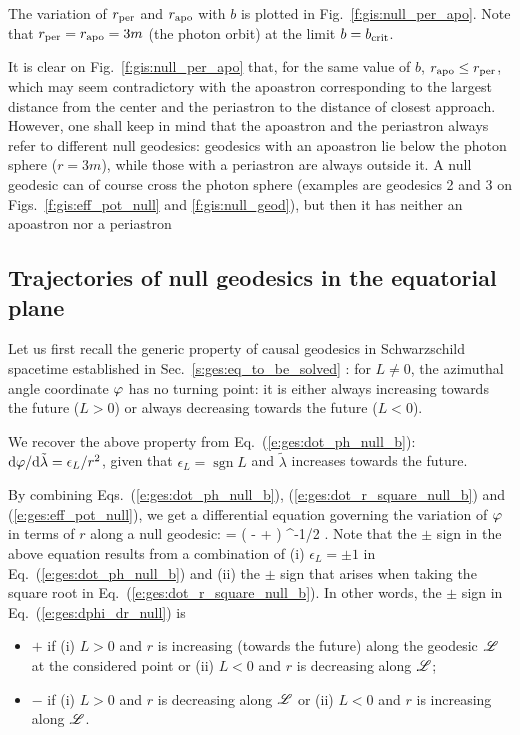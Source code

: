 The variation of $r_{\rm per}$ and $r_{\rm apo}$ with $b$ is plotted
in Fig.~\ref{f:gis:null_per_apo}. Note that $r_{\rm per} = r_{\rm apo} = 3 m$
(the photon orbit) at the limit $b = b_{\rm crit}$.
\begin{remark}
It is clear on Fig.~\ref{f:gis:null_per_apo} that, for the same value of $b$,
$r_{\rm apo} \leq r_{\rm per}$, which may seem contradictory with the apoastron
corresponding to the largest distance from the center and the periastron to
the distance of closest approach.
However, one shall keep in mind that the apoastron and the periastron always refer to different null
geodesics: geodesics with an apoastron lie below the photon sphere ($r=3m$), while those
with a periastron are always outside it. A null geodesic can of course cross
the photon sphere (examples are geodesics 2 and 3 on Figs.~\ref{f:gis:eff_pot_null}
and \ref{f:gis:null_geod}), but then it has neither an apoastron nor a periastron
\end{remark}


\subsection{Trajectories of null geodesics in the equatorial plane}

Let us first recall the generic property of causal geodesics in Schwarzschild
spacetime established in Sec.~\ref{s:ges:eq_to_be_solved} : for $L\not=0$,
the azimuthal angle coordinate $\varphi$ has no turning point: it is either always increasing
towards the future
($L>0$) or always decreasing towards the future ($L<0$).
\begin{remark}
We recover the above property from Eq.~(\ref{e:ges:dot_ph_null_b}):
$\mathrm{d}\varphi/\mathrm{d}\tilde{\lambda} = \epsilon_L/r^2$, given that
$\epsilon_L = \operatorname{sgn} L$ and $\tilde{\lambda}$ increases towards
the future.
\end{remark}
By combining Eqs.~(\ref{e:ges:dot_ph_null_b}), (\ref{e:ges:dot_r_square_null_b})
and (\ref{e:ges:eff_pot_null}), we get a differential equation governing
the variation of $\varphi$ in terms of $r$ along a null geodesic:
\be \label{e:ges:dphi_dr_null}
     = \pm {} \left( 
        -  +    \right) ^{-1/2} .
\ee
Note that the $\pm$ sign in the above equation results from a combination of
(i) $\epsilon_L=\pm 1$ in Eq.~(\ref{e:ges:dot_ph_null_b}) and
(ii) the $\pm$ sign that arises when taking the square
root in Eq.~(\ref{e:ges:dot_r_square_null_b}). In other words, the $\pm$ sign
in Eq.~(\ref{e:ges:dphi_dr_null}) is
\begin{itemize}
\item $+$ if (i) $L>0$ and $r$ is increasing (towards the future) along the geodesic
$\mathscr{L}$ at the considered point or (ii) $L<0$ and $r$ is decreasing along $\mathscr{L}$;
\item $-$ if (i) $L>0$ and $r$ is decreasing along $\mathscr{L}$ or (ii)
$L<0$ and $r$ is increasing along $\mathscr{L}$.
\end{itemize}

